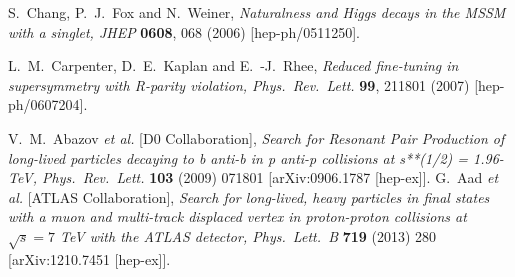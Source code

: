 \documentclass{JHEP3}
\begin{document}
\begin{thebibliography}{99}
  S.~Chang, P.~J.~Fox and N.~Weiner,
  \textit{Naturalness and Higgs decays in the MSSM with a singlet,
  JHEP} {\bf 0608}, 068 (2006)
  [hep-ph/0511250].

  L.~M.~Carpenter, D.~E.~Kaplan and E.~-J.~Rhee,
  \textit{Reduced fine-tuning in supersymmetry with R-parity violation,
  Phys.\ Rev.\ Lett.} {\bf 99}, 211801 (2007)
  [hep-ph/0607204].



  V.~M.~Abazov {\it et al.}  [D0 Collaboration],
  \textit{Search for Resonant Pair Production of long-lived particles decaying to b anti-b in p anti-p collisions
  at s**(1/2) = 1.96-TeV,
  Phys.\ Rev.\ Lett.} {\bf 103} (2009) 071801
  [arXiv:0906.1787 [hep-ex]].
%
%
  G.~Aad {\it et al.}  [ATLAS Collaboration],
  \textit{Search for long-lived, heavy particles in final states with a muon and multi-track displaced vertex in
  proton-proton collisions at $\sqrt{s}=7$ TeV with the ATLAS detector,
  Phys.\ Lett.\ B} {\bf 719} (2013) 280
  [arXiv:1210.7451 [hep-ex]].

%
%


\end{thebibliography}
\end{document}
